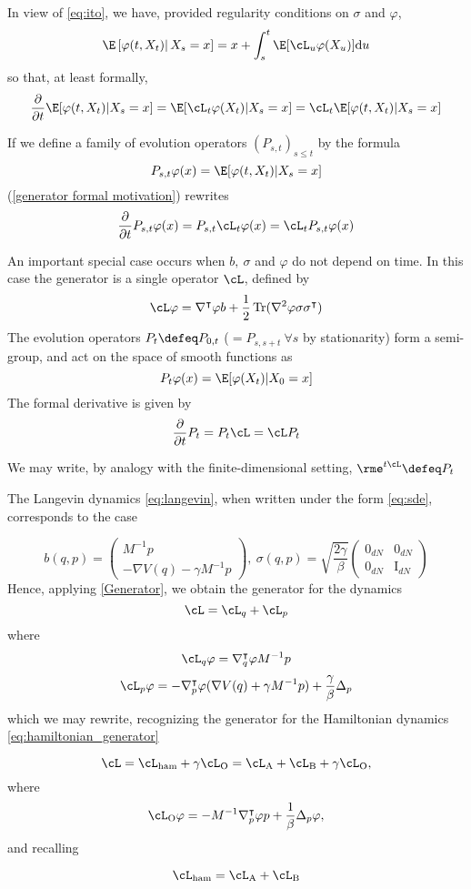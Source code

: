     In view of \eqref{eq:ito}, we have, provided regularity conditions on $\sigma$ and $\varphi$,
    $$\E\left[\varphi(t,X_t)\right|X_s=x]=x+\int_s^t \E[\cL_u\varphi(X_u)] \text du$$
    so that, at least formally,
    \begin{equation}
    \label{generator formal motivation}
    \frac{\partial}{\partial t}\E[\varphi(t,X_t) | X_{s}=x]=\E[\cL_{t} \varphi(X_{t})|X_{s}=x]=\cL_{t}\E[\varphi(t,X_{t})|X_{s}=x]
    \end{equation}

    If we define a family of evolution operators $(P_{s,t})_{s\leq t}$ by the formula
    $$P_{s,t} \varphi (x)= \E[ \varphi (t,X_t) | X_s=x] $$
    (\ref{generator formal motivation}) rewrites
    $$ \frac{\partial}{\partial t} P_{s,t} \varphi (x)=P_{s,t}\cL_t\varphi(x)=\cL_t P_{s,t}\varphi(x)$$
    
    An important special case occurs when $b,\ \sigma$ and $\varphi$ do not depend on time. In this case the generator is a single operator $\cL$, defined by
    $$\cL \varphi = \nabla^\intercal \varphi b + \frac12 \operatorname{Tr}(\nabla^2 \varphi \sigma \sigma ^\intercal)$$ 
    The evolution operators $P_t \defeq P_{0,t}$ ($ = P_{s,s+t}\ \forall s$ by stationarity) form a semi-group, and act on the space of smooth functions as
    $$ P_t \varphi(x)= \E[\varphi(X_t)| X_0=x]$$
    The formal derivative is given by
    $$ \frac{\partial}{\partial t}P_t=P_t\cL=\cL P_t$$
    
    We may write, by analogy with the finite-dimensional setting,
    $\rme^{t\cL}\defeq P_t$

    The Langevin dynamics \eqref{eq:langevin}, when written under the form \eqref{eq:sde}, corresponds to the case 

    $$ b(q,p)= \begin{pmatrix} M^{-1}p \\ -
    \nabla V(q)-\gamma M^{-1}p\end{pmatrix},\ \sigma(q,p)= \sqrt{\frac{2\gamma}\beta}\begin{pmatrix} 0_{dN} &  0_{dN} \\  0_{dN} & \text{I}_{dN} \end{pmatrix}$$
    Hence, applying \ref{Generator}, we obtain the generator for the dynamics
    $$ \cL=  \cL_q + \cL_p $$
    where
    $$ \cL_q \varphi= \nabla^\intercal_q\varphi M^{-1}p$$
    $$ \cL_p\varphi =-\nabla^\intercal_{p}\varphi (\nabla V(q)+\gamma M^{-1}p) +\frac{\gamma}{\beta}\Delta_p $$
    which we may rewrite, recognizing the generator for the Hamiltonian dynamics \eqref{eq:hamiltonian_generator}

    \begin{equation}
        \label{Langevin operator}
    \cL=\cL_{\mathrm{ham}}+\gamma \cL_{\mathrm{O}}=\cL_{\mathrm A}+\cL_{\mathrm B}+\gamma \cL_{\mathrm O},
    \end{equation}
    where 
    $$\cL_{\mathrm{O}}\varphi =-M^{-1}\nabla^\intercal_p\varphi p + \frac1{\beta}\Delta_p\varphi,$$
    and recalling 

    $$\cL_{\mathrm{ham}}=\cL_{\mathrm A}+\cL_{\mathrm B}$$